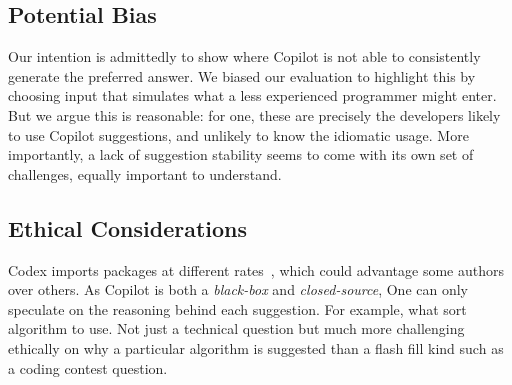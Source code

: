 \subsection{Potential Bias}
Our intention is admittedly to show where Copilot is not able to consistently generate the preferred answer. We biased our evaluation to highlight this by choosing input that simulates what a less experienced programmer might enter. 
But we argue this is reasonable: for one, these are precisely the developers likely to use Copilot suggestions, and unlikely to know the idiomatic usage.
More importantly, a lack of suggestion stability seems to come with its own set of challenges, equally important to understand.%
%

\subsection{Ethical Considerations}
\label{ethics}
Codex imports packages at different rates~\cite{copilot}, which could advantage some authors over others. As Copilot is both a \emph{black-box} and \emph{closed-source}, One can only speculate on the reasoning behind each suggestion.  For example, what sort algorithm to use. Not just a technical question but much more challenging ethically on why a particular algorithm is suggested than a flash fill kind such as a coding contest question.